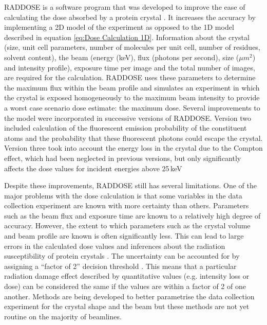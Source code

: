         RADDOSE is a software program that was developed to improve the ease of calculating the dose absorbed by a protein crystal \cite{murray2004}.
        It increases the accuracy by implementing a 2D model of the experiment as opposed to the 1D model described in equation \ref{eq:Dose Calculation 1D}.
        Information about the crystal (size, unit cell parameters, number of molecules per unit cell, number of residues, solvent content), the beam (energy (keV), flux (photons per second), size ($\mu m^2$) and intensity profile), exposure time per image and the total number of images, are required for the calculation.
        RADDOSE uses these parameters to determine the maximum flux within the beam profile and simulates an experiment in which the crystal is exposed homogeneously to the maximum beam intensity to provide a worst case scenario dose estimate: the maximum dose.
        Several improvements to the model were incorporated in successive versions of RADDOSE.
        Version two \cite{pait2009} included calculation of the fluorescent emission probability of the constituent atoms and the probability that these fluorescent photons could escape the crystal.
        Version three \cite{pait2010} took into account the energy loss in the crystal due to the Compton effect, which had been neglected in previous versions, but only significantly affects the dose values for incident energies above 25\,keV

        Despite these improvements, RADDOSE still has several limitations.
        One of the major problems with the dose calculation is that some variables in the data collection experiment are known with more certainty than others.
        Parameters such as the beam flux and exposure time are known to a relatively high degree of accuracy.
        However, the extent to which parameters such as the crystal volume \cite{holton2009} and beam profile \cite{krojer2011} are known is often significantly less.
        This can lead to large errors in the calculated dose values and inferences about the radiation susceptibility of protein crystals \cite{krojer2011}.
        The uncertainty can be accounted for by assigning a ``factor of 2'' decision threshold \cite{holton2009}.
		This means that a particular radiation damage effect described by quantitative values (e.g. intensity loss or dose) can be considered the same if the values are within a factor of 2 of one another.
        Methods are being developed to better parametrise the data collection experiment for the crystal shape \cite{svensson2015fully,khan2012confocal,brockhauser2008x} and the beam \cite{bowler2015massif} but these methods are not yet routine on the majority of beamlines.

